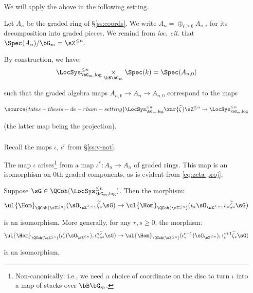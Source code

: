 We will apply the above in the following setting.

Let $A_n$ be the graded ring of \S \ref{ss:coords}.
We write $A_n = \oplus_{i \geq 0} A_{n,i}$ for
its decomposition into graded pieces. We remind
from \emph{loc. cit}. that $\Spec(A_n)/\bG_m = \sZ^{\leq n}$.

By construction, we have:
%
\[
\LocSys_{\bG_m,\log}^{\leq n} \underset{\bB \bG_m}{\times} \Spec(k) = \Spec(A_{n,0})
\]

 such that the graded algebra maps $A_{n,0} \to A_n \to A_{n,0}$
correspond to the maps

\begin{equation}\label{eq:zeta-proj}
\source{tates-thesis-de-rham-setting}
\LocSys_{\bG_m,\log}^{\leq n} \xar{\widetilde{\zeta}} \sZ^{\leq n} \to
\LocSys_{\bG_m,\log}^{\leq n}
\end{equation}

 (the latter map being the projection).

\subsubsection{}\label{sss:gr-hom}

Recall the maps $\iota$, $\iota^r$ from \S \ref{ss:y-not}.

The map $\iota$ arises\footnote{Non-canonically: i.e., we need a choice
of coordinate on the disc to turn $\iota$ into a map of
stacks over $\bB \bG_m$.} from a map $\iota^*:A_n \to A_n$ of graded rings.
This map is an isomorphism
on $0$th graded components, as is evident from
\eqref{eq:zeta-proj}.

\begin{cor}
\notready\label{c:gr-hom}

Suppose $\sG \in \QCoh(\LocSys_{\bG_m,\log}^{\leq n})$. Then the morphism:
%
\[
\ul{\Hom}_{\QCoh(\sZ^{\leq n})}(\sO_{\sZ^{\leq n}},\widetilde{\zeta}_* \sG) \to
\ul{\Hom}_{\QCoh(\sZ^{\leq n})}(\iota_*\sO_{\sZ^{\leq n}},\iota_*\widetilde{\zeta}_* \sG)
\]

 is an isomorphism. More generally,
for any $r,s \geq 0$, the morphism:
%
\[
\ul{\Hom}_{\QCoh(\sZ^{\leq n})}(\iota_*^r(\sO_{\sZ^{\leq n}}),\iota_*^s\widetilde{\zeta}_* \sG) \to
\ul{\Hom}_{\QCoh(\sZ^{\leq n})}(\iota_*^{r+1}(\sO_{\sZ^{\leq n}}),\iota_*^{s+1}\widetilde{\zeta}_* \sG)
\]

 is an isomorphism.

\end{cor}

